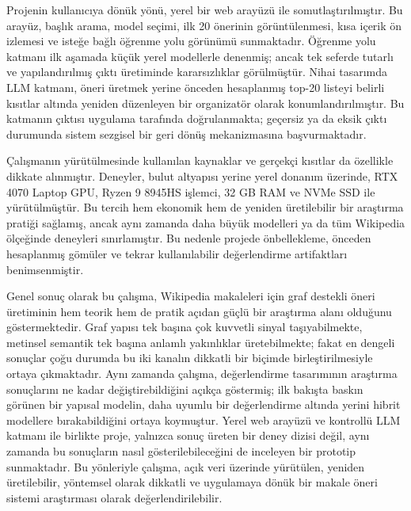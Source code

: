 Projenin kullanıcıya dönük yönü, yerel bir web arayüzü ile
somutlaştırılmıştır. Bu arayüz, başlık arama, model seçimi, ilk 20 önerinin
görüntülenmesi, kısa içerik ön izlemesi ve isteğe bağlı öğrenme yolu görünümü
sunmaktadır. Öğrenme yolu katmanı ilk aşamada küçük yerel modellerle denenmiş;
ancak tek seferde tutarlı ve yapılandırılmış çıktı üretiminde kararsızlıklar
görülmüştür. Nihai tasarımda LLM katmanı, öneri üretmek yerine önceden
hesaplanmış top-20 listeyi belirli kısıtlar altında yeniden düzenleyen bir
organizatör olarak konumlandırılmıştır. Bu katmanın çıktısı uygulama tarafında
doğrulanmakta; geçersiz ya da eksik çıktı durumunda sistem sezgisel bir geri
dönüş mekanizmasına başvurmaktadır.

Çalışmanın yürütülmesinde kullanılan kaynaklar ve gerçekçi kısıtlar da
özellikle dikkate alınmıştır. Deneyler, bulut altyapısı yerine yerel donanım
üzerinde, RTX 4070 Laptop GPU, Ryzen 9 8945HS işlemci, 32 GB RAM ve NVMe SSD
ile yürütülmüştür. Bu tercih hem ekonomik hem de yeniden üretilebilir bir
araştırma pratiği sağlamış, ancak aynı zamanda daha büyük modelleri ya da tüm
Wikipedia ölçeğinde deneyleri sınırlamıştır. Bu nedenle projede önbellekleme,
önceden hesaplanmış gömüler ve tekrar kullanılabilir değerlendirme artifaktları
benimsenmiştir.

Genel sonuç olarak bu çalışma, Wikipedia makaleleri için graf destekli
öneri üretiminin hem teorik hem de pratik açıdan güçlü bir araştırma alanı
olduğunu göstermektedir. Graf yapısı tek başına çok kuvvetli sinyal
taşıyabilmekte, metinsel semantik tek başına anlamlı yakınlıklar
üretebilmekte; fakat en dengeli sonuçlar çoğu durumda bu iki kanalın dikkatli
bir biçimde birleştirilmesiyle ortaya çıkmaktadır. Aynı zamanda çalışma,
değerlendirme tasarımının araştırma sonuçlarını ne kadar değiştirebildiğini
açıkça göstermiş; ilk bakışta baskın görünen bir yapısal modelin, daha uyumlu
bir değerlendirme altında yerini hibrit modellere bırakabildiğini ortaya
koymuştur. Yerel web arayüzü ve kontrollü LLM katmanı ile birlikte proje,
yalnızca sonuç üreten bir deney dizisi değil, aynı zamanda bu sonuçların nasıl
gösterilebileceğini de inceleyen bir prototip sunmaktadır. Bu yönleriyle
çalışma, açık veri üzerinde yürütülen, yeniden üretilebilir, yöntemsel olarak
dikkatli ve uygulamaya dönük bir makale öneri sistemi araştırması olarak
değerlendirilebilir.
